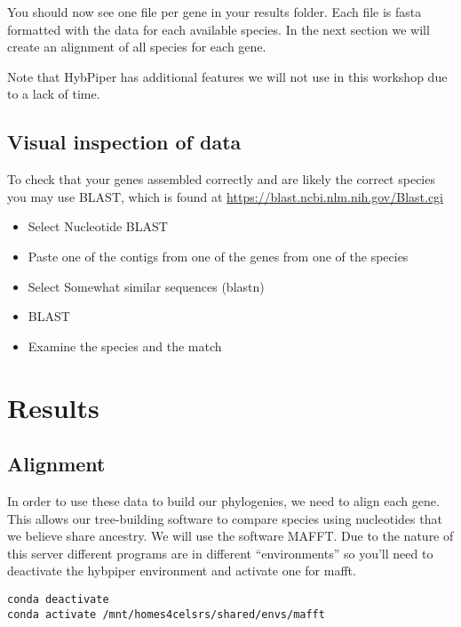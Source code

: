 \documentclass[
]{book}
\providecommand{\tightlist}{%
  \setlength{\itemsep}{0pt}\setlength{\parskip}{0pt}}
\begin{document}
You should now see one file per gene in your results folder.
Each file is fasta formatted with the data for each available species.
In the next section we will create an alignment of all species for each gene.

Note that HybPiper has additional features we will not use in this workshop due to a lack of time.

\hypertarget{visual-inspection-of-data}{%
\section{Visual inspection of data}\label{visual-inspection-of-data}}

To check that your genes assembled correctly and are likely the correct species you may use BLAST, which is found at \url{https://blast.ncbi.nlm.nih.gov/Blast.cgi}

\begin{itemize}
\tightlist
\item
  Select Nucleotide BLAST
\item
  Paste one of the contigs from one of the genes from one of the species
\item
  Select Somewhat similar sequences (blastn)
\item
  BLAST
\item
  Examine the species and the match
\end{itemize}

\hypertarget{results}{%
\chapter{Results}\label{results}}

\hypertarget{alignment}{%
\section{Alignment}\label{alignment}}

In order to use these data to build our phylogenies, we need to align each gene.
This allows our tree-building software to compare species using nucleotides that we believe share ancestry.
We will use the software MAFFT.
Due to the nature of this server different programs are in different ``environments'' so you'll need to deactivate the hybpiper environment and activate one for mafft.

\begin{verbatim}
conda deactivate
conda activate /mnt/homes4celsrs/shared/envs/mafft
\end{verbatim}
\end{document}
